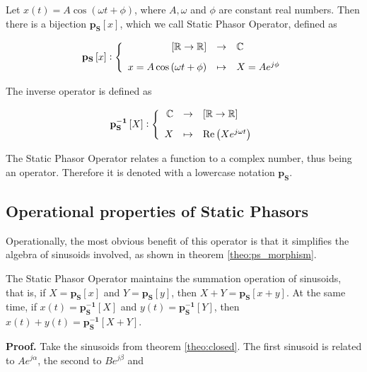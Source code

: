 \begin{definition}\label{def:static_phasor_transform} %
Let $x(t) = A\cos\left(\omega t + \phi\right)$, where $A,\omega$ and $\phi$ are constant real numbers. Then there is a bijection $\mathbf{p_S}\left[x\right]$, which we call Static Phasor Operator, defined as 

\begin{equation}
	\mathbf{p_S}\left[x\right] \vcentcolon \left\{\begin{array}{rcl}
	\left[\mathbb{R}\to \mathbb{R}\right] &\to& \mathbb{C} \\[3mm]
	x = A\cos\left(\omega t + \phi\right) &\mapsto& X = A e^{j\phi}
\end{array}\right.
\end{equation}

	The inverse operator is defined as

\begin{equation}
	\mathbf{p_S^{-1}}\left[X\right] \vcentcolon \left\{\begin{array}{rcl}
	\mathbb{C} &\to& \left[\mathbb{R}\to \mathbb{R}\right]  \\[3mm]
	X &\mapsto& \Re\left(Xe^{j\omega t}\right)
\end{array}\right.
\end{equation}
\end{definition} %
\begin{definitionremark} The Static Phasor Operator relates a function to a complex number, thus being an operator. Therefore it is denoted with a lowercase notation $\mathbf{p_S}$. \end{definitionremark}
\subsection{Operational properties of Static Phasors} %

	Operationally, the most obvious benefit of this operator is that it simplifies the algebra of sinusoids involved, as shown in theorem \ref{theo:ps_morphism}.

\begin{theorem} \label{theo:ps_morphism}%
	The Static Phasor Operator maintains the summation operation of sinusoids, that is, if $X = \mathbf{p_S}\left[x\right]$ and $Y = \mathbf{p_S}\left[y\right]$, then $X + Y = \mathbf{p_S}\left[x + y\right]$. At the same time, if $x(t) = \mathbf{p_S^{-1}}\left[X\right]$ and $y(t) = \mathbf{p_S^{-1}}\left[Y\right]$, then $x(t) + y(t) = \mathbf{p_S^{-1}}\left[X + Y\right]$.
\end{theorem}
\noindent\textbf{Proof.} Take the sinusoids from theorem \ref{theo:closed}. The first sinusoid is related to $Ae^{j\alpha}$, the second to $Be^{j\beta}$ and

